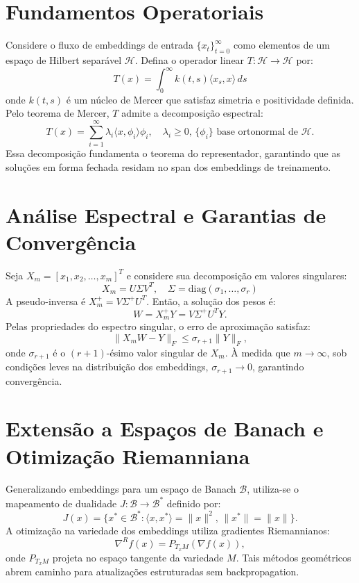 \documentclass[11pt]{article}
\begin{document}
\newpage
\section{Fundamentos Operatoriais}
Considere o fluxo de embeddings de entrada $\{x_t\}_{t=0}^\infty$ como elementos de um espaço de Hilbert separável $\mathcal{H}$. Defina o operador linear $T: \mathcal{H} \to \mathcal{H}$ por:
\begin{equation}
T(x) = \int_0^\infty k(t, s) \langle x_s, x \rangle \, ds
\end{equation}
onde $k(t,s)$ é um núcleo de Mercer que satisfaz simetria e positividade definida. Pelo teorema de Mercer, $T$ admite a decomposição espectral:
\begin{equation}
T(x) = \sum_{i=1}^\infty \lambda_i \langle x, \phi_i \rangle \phi_i, \quad \lambda_i \ge 0, \, \{\phi_i\} \text{ base ortonormal de }\mathcal{H}.
\end{equation}
Essa decomposição fundamenta o teorema do representador, garantindo que as soluções em forma fechada residam no span dos embeddings de treinamento.

\section{Análise Espectral e Garantias de Convergência}
Seja $X_m = [x_1, x_2, \dots, x_m]^T$ e considere sua decomposição em valores singulares:
\begin{equation}
X_m = U \Sigma V^T, \quad \Sigma = \mathrm{diag}(\sigma_1, \dots, \sigma_r)
\end{equation}
A pseudo-inversa é $X_m^+ = V \Sigma^+ U^T$. Então, a solução dos pesos é:
\begin{equation}
W = X_m^+ Y = V \Sigma^+ U^T Y.
\end{equation}
Pelas propriedades do espectro singular, o erro de aproximação satisfaz:
\begin{equation}
\|X_m W - Y\|_F \le \sigma_{r+1} \|Y\|_F,
\end{equation}
onde $\sigma_{r+1}$ é o $(r+1)$-ésimo valor singular de $X_m$. À medida que $m \to \infty$, sob condições leves na distribuição dos embeddings, $\sigma_{r+1} \to 0$, garantindo convergência.

\section{Extensão a Espaços de Banach e Otimização Riemanniana}
Generalizando embeddings para um espaço de Banach $\mathcal{B}$, utiliza-se o mapeamento de dualidade $J: \mathcal{B} \to \mathcal{B}^*$ definido por:
\begin{equation}
J(x) = \{ x^* \in \mathcal{B}^* : \langle x, x^* \rangle = \|x\|^2, \, \|x^*\| = \|x\| \}.
\end{equation}
A otimização na variedade dos embeddings utiliza gradientes Riemannianos:
\begin{equation}
\nabla^R f(x) = P_{T_x M}(\nabla f(x)),
\end{equation}
onde $P_{T_x M}$ projeta no espaço tangente da variedade $M$. Tais métodos geométricos abrem caminho para atualizações estruturadas sem backpropagation.
\end{document}
